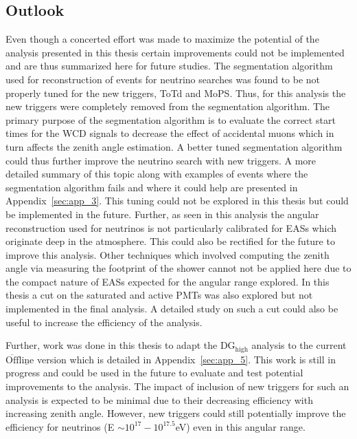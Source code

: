 \subsection*{Outlook}
Even though a concerted effort was made to maximize the potential of the analysis presented in this thesis certain improvements could not be implemented and are thus summarized here for future studies. The segmentation algorithm used for reconstruction of events for neutrino searches was found to be not properly tuned for the new triggers, ToTd and MoPS. Thus, for this analysis the new triggers were completely removed from the segmentation algorithm. The primary purpose of the segmentation algorithm is to evaluate the correct start times for the WCD signals to decrease the effect of accidental muons which in turn affects the zenith angle estimation. A better tuned segmentation algorithm could thus further improve the neutrino search with new triggers. A more detailed summary of this topic along with examples of events where the segmentation algorithm fails and where it could help are presented in Appendix~\ref{sec:app_3}. This tuning could not be explored in this thesis but could be implemented in the future. Further, as seen in this analysis the angular reconstruction used for neutrinos is not particularly calibrated for EASs which originate deep in the atmosphere. This could also be rectified for the future to improve this analysis. Other techniques which involved computing the zenith angle via measuring the footprint of the shower cannot not be applied here due to the compact nature of EASs expected for the angular range explored. In this thesis a cut on the saturated and active PMTs was also explored but not implemented in the final analysis. A detailed study on such a cut could also be useful to increase the efficiency of the analysis. 

Further, work was done in this thesis to adapt the DG$\mathrm{_{high}}$ analysis to the current $\mathrm{\overline{Off} \underline{line}}$ version which is detailed in Appendix~\ref{sec:app_5}. This work is still in progress and could be used in the future to evaluate and test potential improvements to the analysis. The impact of inclusion of new triggers for such an analysis is expected to be minimal due to their decreasing efficiency with increasing zenith angle. However, new triggers could still potentially improve the efficiency for neutrinos (E $\sim 10^{17}-10^{17.5}$eV) even in this angular range. 

